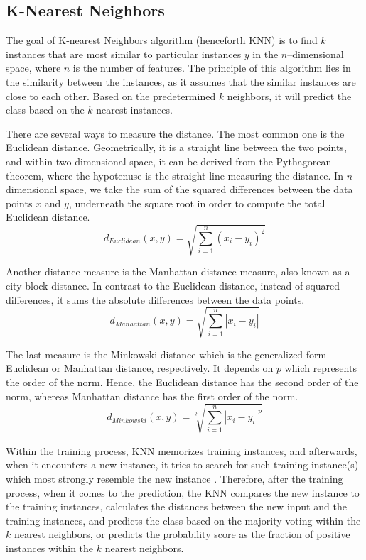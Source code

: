 \subsection{K-Nearest Neighbors}
\label{subsec:knn-theory}

The goal of K-nearest Neighbors algorithm (henceforth KNN) is to find $k$ instances that are most similar to particular instances $y$ in the $n$--dimensional space, where $n$ is the number of features.
The principle of this algorithm lies in the similarity between the instances, as it assumes that the similar instances are close to each other.
Based on the predetermined $k$ neighbors, it will predict the class based on the $k$ nearest instances.


There are several ways to measure the distance. The most common one is the Euclidean distance. Geometrically, it is a straight line between the two points, and within two-dimensional space, it can be derived from the Pythagorean theorem, where the hypotenuse is the straight line measuring the distance. In $n$-dimensional space, we take the sum of the squared differences between the data points $x$ and $y$, underneath the square root in order to compute the total Euclidean distance.
\begin{equation}\label{eq}
d_{Euclidean}(x,y) = \sqrt{\sum\limits_{i=1}^{n} (x_i - y_i)^2}
\end{equation}

Another distance measure is the Manhattan distance measure, also known as a city block distance.
In contrast to the Euclidean distance, instead of squared differences, it sums the absolute differences between the data points.
\begin{equation}\label{eq}
d_{Manhattan}(x,y) = \sqrt{\sum\limits_{i=1}^{n} |x_i - y_i|}
\end{equation}

The last measure is the Minkowski distance which is the generalized form Euclidean or Manhattan distance, respectively.
It depends on $p$ which represents the order of the norm. Hence, the Euclidean distance has the second order of the norm, whereas Manhattan distance has the first order of the norm.
\begin{equation}\label{eq}
d_{Minkowski}(x,y) = \sqrt[p]{\sum\limits_{i=1}^{n} |x_i - y_i|^p}
\end{equation}

Within the training process, KNN memorizes training instances, and afterwards, when it encounters a new instance, it tries to search for such training instance(s) which most strongly resemble the new instance \citep{witten2011data}.
Therefore, after the training process, when it comes to the prediction, the KNN compares the new instance to the training instances, calculates the distances between the new input and the training instances, and predicts the class based on the majority voting within the $k$ nearest neighbors, or predicts the probability score as the fraction of positive instances within the $k$ nearest neighbors.


